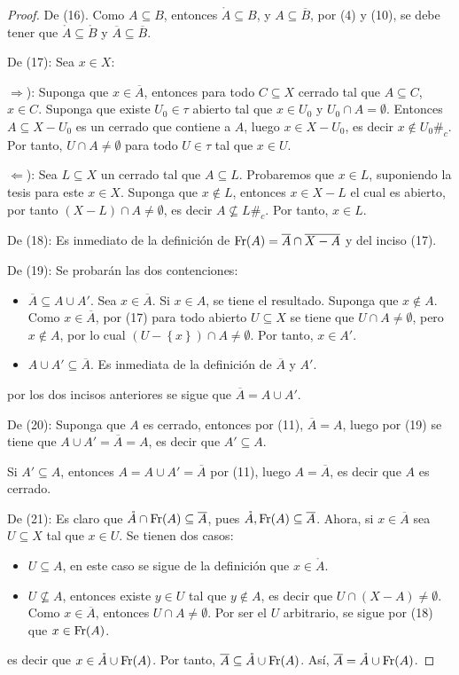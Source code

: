 \documentclass[12pt]{report}
\theoremstyle{largebreak}
\newcommand\contradiction{\ensuremath{\#_c}}
\newcommand{\Int}[1]{\ensuremath{\mathring{#1}}}
\newcommand{\Cls}[1]{\ensuremath{\overline{#1}}}
\newcommand{\Fr}[1]{\ensuremath{\textup{Fr}(#1)}}
\begin{document}
\begin{proof}
        De (16). Como $A\subseteq B$, entonces $\Int{A}\subseteq B$, y $A\subseteq\Cls{B}$, por (4) y (10), se debe tener que $\Int{A}\subseteq\Int{B}$ y $\Cls{A}\subseteq\Cls{B}$.

        De (17): Sea $x\in X$:
        
        $\Rightarrow$): Suponga que $x\in\Cls{A}$, entonces para todo $C\subseteq X$ cerrado tal que $A\subseteq C$, $x\in C$. Suponga que existe $U_0\in\tau$ abierto tal que $x\in U_0$ y $U_0\cap A=\emptyset$. Entonces $A\subseteq X-U_0$ es un cerrado que contiene a $A$, luego $x\in X-U_0$, es decir $x\notin U_0$\contradiction. Por tanto, $U\cap A\neq\emptyset$ para todo $U\in\tau$ tal que $x\in U$.

        $\Leftarrow$): Sea $L\subseteq X$ un cerrado tal que $A\subseteq L$. Probaremos que $x\in L$, suponiendo la tesis para este $x\in X$. Suponga que $x\notin L$, entonces $x\in X-L$ el cual es abierto, por tanto $(X-L)\cap A\neq\emptyset$, es decir $A\nsubseteq L$\contradiction. Por tanto, $x\in L$.
        
        De (18): Es inmediato de la definición de $\Fr{A}=\Cls{A}\cap\Cls{X-A}$ y del inciso (17).

        De (19): Se probarán las dos contenciones:
        \begin{itemize}
            \item $\Cls{A}\subseteq A\cup A'$. Sea $x\in\Cls{A}$. Si $x\in A$, se tiene el resultado. Suponga que $x\notin A$. Como $x\in\Cls{A}$, por (17) para todo abierto $U\subseteq X$ se tiene que $U\cap A\neq\emptyset$, pero $x\notin A$, por lo cual $(U-\left\{x\right\})\cap A\neq\emptyset$. Por tanto, $x\in A'$.
            \item $A\cup A'\subseteq\Cls{A}$. Es inmediata de la definición de $\Cls{A}$ y $A'$.
        \end{itemize}
        por los dos incisos anteriores se sigue que $\Cls{A}=A\cup A'$.

        De (20): Suponga que $A$ es cerrado, entonces por (11), $\Cls{A}=A$, luego por (19) se tiene que $A\cup A'=\Cls{A}=A$, es decir que $A'\subseteq A$.
        
        Si $A'\subseteq A$, entonces $A=A\cup A'=\Cls{A}$ por (11), luego $A=\Cls{A}$, es decir que $A$ es cerrado.
        
        De (21): Es claro que $\Int{A}\cap\Fr{A}\subseteq\Cls{A}$, pues $\Int{A},\Fr{A}\subseteq\Cls{A}$. Ahora, si $x\in\Cls{A}$ sea $U\subseteq X$ tal que $x\in U$. Se tienen dos casos:
        \begin{itemize}
            \item $U\subseteq A$, en este caso se sigue de la definición que $x\in\Int{A}$.
            \item $U\nsubseteq A$, entonces existe $y\in U$ tal que $y\notin A$, es decir que $U\cap(X-A)\neq\emptyset$. Como $x\in \Cls{A}$, entonces $U\cap A\neq\emptyset$. Por ser el $U$ arbitrario, se sigue por (18) que $x\in\Fr{A}$.
        \end{itemize}
        es decir que $x\in\Int{A}\cup\Fr{A}$. Por tanto, $\Cls{A}\subseteq\Int{A}\cup\Fr{A}$. Así, $\Cls{A}=\Int{A}\cup\Fr{A}$.


\end{proof}
\end{document}
